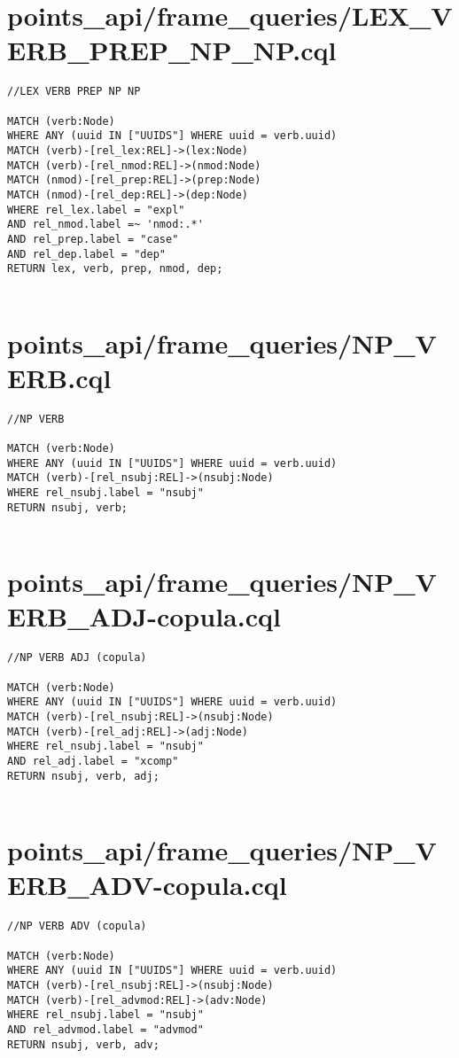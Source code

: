 \documentclass{article}
\begin{document}
\section*{points\_api/frame\_queries/LEX\_VERB\_PREP\_NP\_NP.cql}
\begin{verbatim}
//LEX VERB PREP NP NP

MATCH (verb:Node)
WHERE ANY (uuid IN ["UUIDS"] WHERE uuid = verb.uuid)
MATCH (verb)-[rel_lex:REL]->(lex:Node)
MATCH (verb)-[rel_nmod:REL]->(nmod:Node)
MATCH (nmod)-[rel_prep:REL]->(prep:Node)
MATCH (nmod)-[rel_dep:REL]->(dep:Node)
WHERE rel_lex.label = "expl"
AND rel_nmod.label =~ 'nmod:.*'
AND rel_prep.label = "case"
AND rel_dep.label = "dep"
RETURN lex, verb, prep, nmod, dep;


\end{verbatim}
\pagebreak

\section*{points\_api/frame\_queries/NP\_VERB.cql}
\begin{verbatim}
//NP VERB

MATCH (verb:Node)
WHERE ANY (uuid IN ["UUIDS"] WHERE uuid = verb.uuid)
MATCH (verb)-[rel_nsubj:REL]->(nsubj:Node)
WHERE rel_nsubj.label = "nsubj"
RETURN nsubj, verb;


\end{verbatim}
\pagebreak

\section*{points\_api/frame\_queries/NP\_VERB\_ADJ-copula.cql}
\begin{verbatim}
//NP VERB ADJ (copula)

MATCH (verb:Node)
WHERE ANY (uuid IN ["UUIDS"] WHERE uuid = verb.uuid)
MATCH (verb)-[rel_nsubj:REL]->(nsubj:Node)
MATCH (verb)-[rel_adj:REL]->(adj:Node)
WHERE rel_nsubj.label = "nsubj"
AND rel_adj.label = "xcomp"
RETURN nsubj, verb, adj;


\end{verbatim}
\pagebreak

\section*{points\_api/frame\_queries/NP\_VERB\_ADV-copula.cql}
\begin{verbatim}
//NP VERB ADV (copula)

MATCH (verb:Node)
WHERE ANY (uuid IN ["UUIDS"] WHERE uuid = verb.uuid)
MATCH (verb)-[rel_nsubj:REL]->(nsubj:Node)
MATCH (verb)-[rel_advmod:REL]->(adv:Node)
WHERE rel_nsubj.label = "nsubj"
AND rel_advmod.label = "advmod"
RETURN nsubj, verb, adv;


\end{verbatim}
\pagebreak
\end{document}
